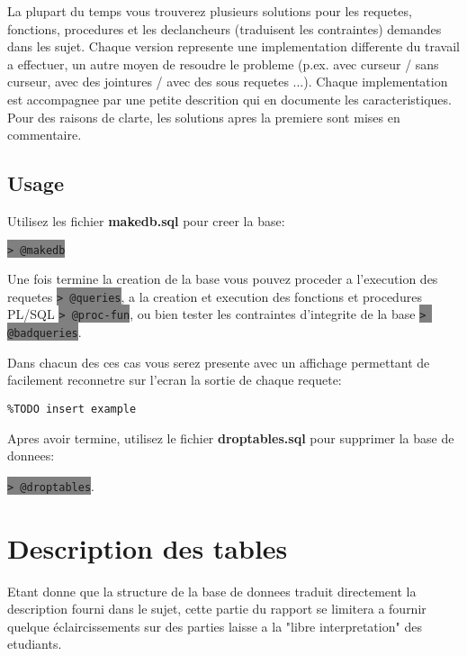 \documentclass[twoside,openright,a4paper,11pt,french]{article}
\begin{document}
\bigbreak
La plupart du temps vous trouverez plusieurs solutions pour les requetes,
fonctions, procedures et les declancheurs (traduisent les contraintes) demandes
dans les sujet. Chaque version represente une implementation differente du
travail a effectuer, un autre moyen de resoudre le probleme  (p.ex. avec
curseur / sans curseur, avec des jointures / avec des sous requetes ...).
Chaque implementation est accompagnee par une petite descrition qui en
documente les caracteristiques.  Pour des raisons de clarte, les solutions
apres la premiere sont mises en commentaire. 

\subsection{Usage}
Utilisez les fichier {\bf makedb.sql} pour creer la base:
\begin{center}
\colorbox{gray}{\lstinline[basicstyle=\ttfamily\color{black}]|> @makedb|}
\end{center}
Une fois termine la creation de la base vous pouvez proceder a l'execution des
requetes
\colorbox{gray}{\lstinline[basicstyle=\ttfamily\color{black}]|> @queries|},
a la creation et execution des fonctions et procedures PL/SQL
\colorbox{gray}{\lstinline[basicstyle=\ttfamily\color{black}]|> @proc-fun|},
ou bien tester les contraintes d'integrite de la base
\colorbox{gray}{\lstinline[basicstyle=\ttfamily\color{black}]|> @badqueries|}.

\smallbreak
Dans chacun des ces cas vous serez presente avec un affichage permettant de
facilement reconnetre sur l'ecran la sortie de chaque requete:

\begin{lstlisting}
%TODO insert example
\end{lstlisting}

Apres avoir termine, utilisez le fichier {\bf droptables.sql} pour supprimer
la base de donnees:
\begin{center}
\colorbox{gray}{\lstinline[basicstyle=\ttfamily\color{black}]|> @droptables|}.
\end{center}

\section{Description des tables}
Etant donne que la structure de la base de donnees traduit directement la
description fourni dans le sujet, cette partie du rapport se limitera a fournir
quelque éclaircissements sur des parties laisse a la "libre interpretation" des
etudiants.
\end{document}
